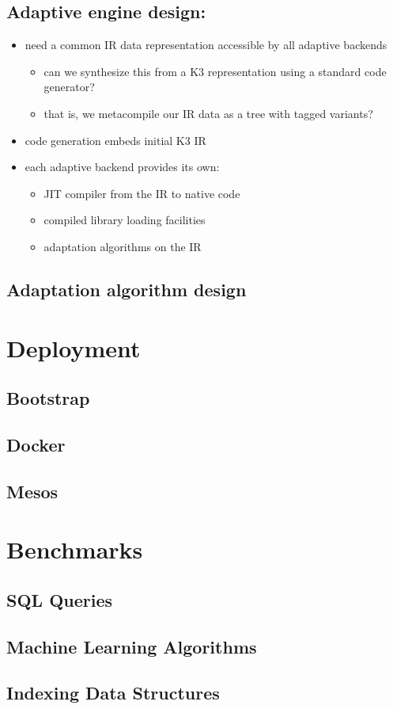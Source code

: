 \documentclass[10pt]{article}
\begin{document}
  \subsection{Adaptive engine design:}
    \begin{itemize}
      \item need a common IR data representation accessible by all adaptive backends
        \begin{itemize}
          \item can we synthesize this from a K3 representation using a standard code generator?
          \item that is, we metacompile our IR data as a tree with tagged variants?
        \end{itemize}
      \item code generation embeds initial K3 IR
      \item each adaptive backend provides its own:
        \begin{itemize}
          \item JIT compiler from the IR to native code
          \item compiled library loading facilities
          \item adaptation algorithms on the IR
        \end{itemize}
    \end{itemize}

  \subsection{Adaptation algorithm design}

\section{Deployment}
  \subsection{Bootstrap}
  \subsection{Docker}
  \subsection{Mesos}

\section{Benchmarks}
  \subsection{SQL Queries}
  \subsection{Machine Learning Algorithms}
  \subsection{Indexing Data Structures}
\end{document}
